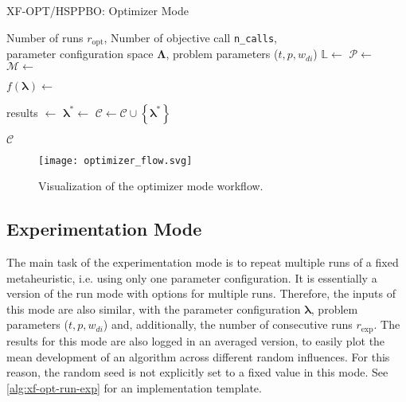 \begin{algorithm}
	\caption{XF-OPT/HSPPBO: Optimizer Mode}
	\label{alg:xf-opt}
	\begin{algorithmic}
		\Require Number of runs $r_{\text{opt}}$, Number of objective call \texttt{n\_calls},\\ \quad parameter configuration space $\mathbf{\Lambda}$, problem parameters ($t, p, w_{di}$)
		\State $\mathbb{L}  \gets $  
		\State $\mathcal{P}  \gets $ 
		\State $\mathcal{M}  \gets $ 
		
		\State {}
		
		\State $f(\mathbf{\lambda}) \gets  $ 
		
		\State {}
		\State results $\gets $ 
		\State {}
		\State $\mathbf{\lambda}^* \gets$ 
		\State $\mathcal{C} \gets \mathcal{C} \cup \left\lbrace \mathbf{\lambda}^* \right\rbrace$
		
		\EndFor
		\State \Return $\mathcal{C}$
	\end{algorithmic}
\end{algorithm}

\begin{figure}
	\centering
	\texttt{[image: optimizer\_flow.svg]}
	\caption{Visualization of the optimizer mode workflow.}
	\label{fig:optimizer-flow}
\end{figure}

\subsection{Experimentation Mode}
\label{chap:exp-mode}

The main task of the experimentation mode is to repeat multiple runs of a fixed metaheuristic, i.e. using only one parameter configuration. It is essentially a version of the run mode with options for multiple runs. Therefore, the inputs of this mode are also similar, with the parameter configuration $\mathbf{\lambda}$, problem parameters ($t, p, w_{di}$) and, additionally, the number of consecutive runs $r_\text{exp}$. The results for this mode are also logged in an averaged version, to easily plot the mean development of an algorithm across different random influences. For this reason, the random seed is not explicitly set to a fixed value in this mode. See \cref{alg:xf-opt-run-exp} for an implementation template.


